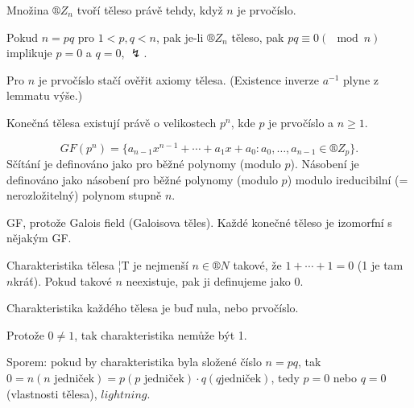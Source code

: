 \documentclass[12pt]{article}					%
\begin{document}
        \begin{veta}
            Množina $®Z_n$ tvoří těleso právě tehdy, když $n$ je prvočíslo.

            \begin{dukazin}
                Pokud $n=pq$ pro $1<p, q<n$, pak je-li $®Z_n$ těleso, pak $pq≡0 (\mod n)$ implikuje $p=0$ a $q=0$, $\lightning$.

                Pro $n$ je prvočíslo stačí ověřit axiomy tělesa. (Existence inverze $a^{-1}$ plyne z lemmatu výše.)
            \end{dukazin}
        \end{veta}

        \begin{veta}
            Konečná tělesa existují právě o velikostech $p^n$, kde $p$ je prvočíslo a $n≥1$.

            \begin{dukaz}
                $$ GF(p^n) = \{a_{n-1}x^{n-1} + \cdots + a_1 x + a_0: a_0,…,a_{n-1} \in ®Z_p\}. $$
                Sčítání je definováno jako pro běžné polynomy (modulo $p$). Násobení je definováno jako násobení pro běžné polynomy (modulo $p$) modulo ireducibilní (= nerozložitelný) polynom stupně $n$.
            \end{dukaz}
        \end{veta}

        \begin{poznamka}
            GF, protože Galois field (Galoisova těles). Každé konečné těleso je izomorfní s nějakým GF.
        \end{poznamka}

        \begin{definice}
            Charakteristika tělesa ¦T je nejmenší $n \in ®N$ takové, že $1 + \cdots + 1 = 0$ (1 je tam $n$kráť). Pokud takové $n$ neexistuje, pak ji definujeme jako 0.
        \end{definice}

        \begin{tvrzeni}
            Charakteristika každého tělesa je buď nula, nebo prvočíslo.
            \begin{dukazin}
                Protože $0≠1$, tak charakteristika nemůže být 1.

                Sporem: pokud by charakteristika byla složené číslo $n=pq$, tak $0 = n (n\text{ jedniček}) = p (p\text{ jedniček})·q (q \text{jedniček})$, tedy $p = 0$ nebo $q = 0$ (vlastnosti tělesa), $lightning$.
            \end{dukazin}
        \end{tvrzeni}
\end{document}
